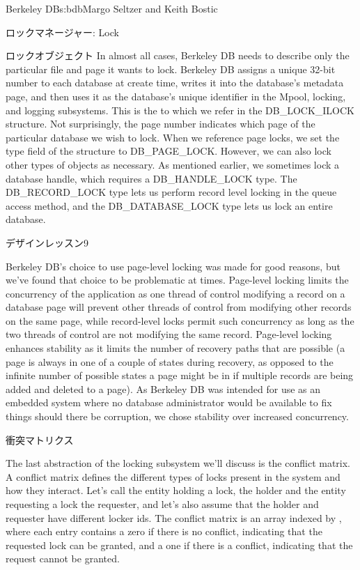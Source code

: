 \begin{aosachapter}{Berkeley DB}{s:bdb}{Margo Seltzer and Keith Bostic}
\begin{aosasect1}{ロックマネージャー: Lock}
\begin{aosasect2}{ロックオブジェクト}
In almost all cases, Berkeley DB needs to describe only the particular
file and page it wants to lock. Berkeley DB assigns a unique 32-bit
number to each database at create time, writes it into the database's
metadata page, and then uses it as the database's unique identifier
in the Mpool, locking, and logging subsystems. This is the
 to which we refer in the DB\_LOCK\_ILOCK structure. Not
surprisingly, the page number indicates which page of the particular
database we wish to lock.  When we reference page locks, we set the
type field of the structure to DB\_PAGE\_LOCK\@.  However, we can also
lock other types of objects as necessary. As mentioned earlier, we
sometimes lock a database handle, which requires a DB\_HANDLE\_LOCK
type. The DB\_RECORD\_LOCK type lets us perform record level locking
in the queue access method, and the DB\_DATABASE\_LOCK type lets us
lock an entire database. 
\hspace{-.5cm}
\begin{aosabox}{デザインレッスン9}

Berkeley DB's choice to use page-level locking was made for good
reasons, but we've found that choice to be problematic at times. Page-level locking
limits the concurrency of the application as one thread of control
modifying a record on a database page will prevent other threads of
control from modifying other records on the same page, while
record-level locks permit such concurrency as long as the two threads
of control are not modifying the same record.  Page-level locking
enhances stability as it limits the number of recovery paths that are
possible (a page is always in one of a couple of states during
recovery, as opposed to the infinite number of possible states a page
might be in if multiple records are being added and deleted to a
page). As Berkeley DB was intended for use as an embedded system where
no database administrator would be available to fix things should
there be corruption, we chose stability over increased concurrency.

\end{aosabox}

\end{aosasect2}

\begin{aosasect2}{衝突マトリクス}

The last abstraction of the locking subsystem we'll discuss is the
conflict matrix. A conflict matrix defines the different types of
locks present in the system and how they interact. Let's call the
entity holding a lock, the holder and the entity requesting a lock the
requester, and let's also assume that the holder and requester have
different locker ids.  The conflict matrix is an array indexed by
\code{[requester][holder]}, where each entry contains a zero if there
is no conflict, indicating that the requested lock can be granted, and
a one if there is a conflict, indicating that the request cannot be
granted.


\end{aosasect2}
\end{aosasect1}
\end{aosachapter}
